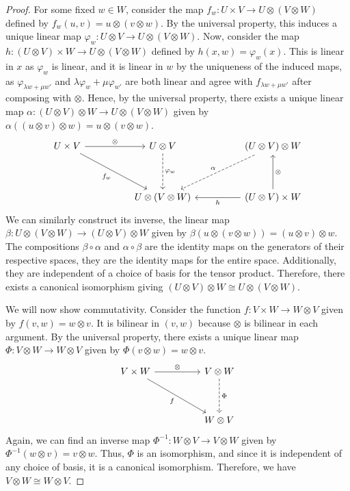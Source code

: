 \documentclass[a4paper,12pt]{article}
\begin{document}
\begin{proof}
    For some fixed $w \in W$, consider the map $f_w \colon U \times V \to U \otimes (V \otimes W)$ defined by $f_w(u, v) = u \otimes (v \otimes w)$.
    By the universal property, this induces a unique linear map $\varphi_w \colon U \otimes V \to U \otimes (V \otimes W)$.
    Now, consider the map $h \colon (U \otimes V) \times W \to U \otimes (V \otimes W)$ defined by $h(x, w) = \varphi_w(x)$.
    This is linear in $x$ as $\varphi_w$ is linear, and it is linear in $w$ by the uniqueness of the induced maps, as $\varphi_{\lambda w + \mu w'}$ and $\lambda \varphi_w + \mu \varphi_{w'}$ are both linear and agree with $f_{\lambda w + \mu w'}$ after composing with $\otimes$.
    Hence, by the universal property, there exists a unique linear map $\alpha \colon (U \otimes V) \otimes W \to U \otimes (V \otimes W)$ given by $\alpha((u \otimes v) \otimes w) = u \otimes (v \otimes w)$.
    \[\begin{tikzcd}
        {U \times V} && {U \otimes V} && {(U \otimes V) \otimes W} \\
        \\
        && {U \otimes (V \otimes W)} && {(U \otimes V) \times W}
        \arrow["\otimes", from=1-1, to=1-3]
        \arrow["{f_w}"', from=1-1, to=3-3]
        \arrow["{\varphi_w}", dashed, from=1-3, to=3-3]
        \arrow["\alpha"', dashed, from=1-5, to=3-3]
        \arrow["\otimes"', from=3-5, to=1-5]
        \arrow["h", from=3-5, to=3-3]
    \end{tikzcd}\]
    We can similarly construct its inverse, the linear map $\beta \colon U \otimes (V \otimes W) \to (U \otimes V) \otimes W$ given by $\beta(u \otimes (v \otimes w)) = (u \otimes v) \otimes w$.
    The compositions $\beta \circ \alpha$ and $\alpha \circ \beta$ are the identity maps on the generators of their respective spaces, they are the identity maps for the entire space.
    Additionally, they are independent of a choice of basis for the tensor product.
    Therefore, there exists a canonical isomorphism giving $(U \otimes V) \otimes W \cong U \otimes (V \otimes W)$.

    We will now show commutativity.
    Consider the function $f \colon V \times W \to W \otimes V$ given by $f(v, w) = w \otimes v$.
    It is bilinear in $(v, w)$ because $\otimes$ is bilinear in each argument.
    By the universal property, there exists a unique linear map $\Phi \colon V \otimes W \to W \otimes V$ given by $\Phi(v \otimes w) = w \otimes v$.
    \[\begin{tikzcd}
        {V \times W} && {V \otimes W} \\
        \\
        && {W \otimes V}
        \arrow["\otimes", from=1-1, to=1-3]
        \arrow["f"', from=1-1, to=3-3]
        \arrow["\Phi", dashed, from=1-3, to=3-3]
    \end{tikzcd}\]
    Again, we can find an inverse map $\Phi^{-1} \colon W \otimes V \to V \otimes W$ given by $\Phi^{-1}(w \otimes v) = v \otimes w$.
    Thus, $\Phi$ is an isomorphism, and since it is independent of any choice of basis, it is a canonical isomorphism.
    Therefore, we have $V \otimes W \cong W \otimes V$.
\end{proof}
\end{document}
